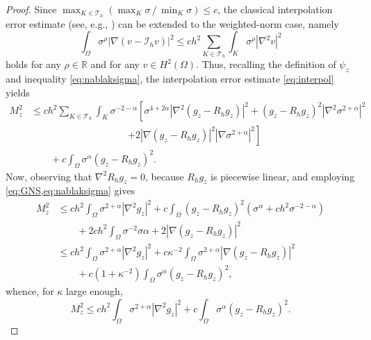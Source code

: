 \documentclass[final,hidelinks]{siamart1116Arxiv}
\numberwithin{theorem}{section}
\newcommand{\interpol}{{\mathcal{I}}}
\begin{document}
\begin{proof}
Since $\max_{K\in\mathcal T_h}(\max_K\sigma\,/\,\min_K\sigma)\leq c$, the classical interpolation error estimate (see, e.g., \cite[Theorem 3.4.3]{QV}) can be extended to the weighted-norm case, namely
\begin{equation}\label{eq:interpol}
 \int_\Omega\sigma^\rho|\nabla(v-\interpol_hv)|^2 \leq ch^2\sum_{K\in\mathcal T_h}\int_K\sigma^\rho|\nabla^2v|^2
\end{equation}
holds for any $\rho\in\mathbb R$ and for any $v\in H^2(\Omega)$.
Thus, recalling the definition of $\psi_z$ and inequality \cref{eq:nablaksigma}, the interpolation error estimate \cref{eq:interpol} yields
\begin{align}\label{eq:prepreprelemma1}
 M_z^2 &\leq ch^2\sum_{K\in\mathcal T_h}\int_K\sigma^{-2-\alpha}\left[\sigma^{4+2\alpha}|\nabla^2(g_z-R_hg_z)|^2 +(g_z-R_hg_z)^2|\nabla^2\sigma^{2+\alpha}|^2 \right.\\
 &\qquad\qquad\qquad\qquad\qquad\left.+ 2|\nabla (g_z-R_hg_z)|^2|\nabla\sigma^{2+\alpha}|^2\right]\\
 &\qquad+ c\int_\Omega\sigma^\alpha(g_z-R_hg_z)^2.
\end{align}
Now, observing that $\nabla^2R_hg_z=0$, because $R_hg_z$ is piecewise linear, and employing \cref{eq:GNS,eq:nablaksigma} gives
\begin{align}\label{eq:preprelemma1}
 M_z^2&\leq ch^2\int_\Omega\sigma^{2+\alpha}|\nabla^2g_z|^2 + c\int_\Omega(g_z-R_hg_z)^2\left(\sigma^\alpha+ch^2\sigma^{-2-\alpha}\right) \\
 &\qquad + 2ch^2\int_\Omega\sigma^{-2}\sigma{\alpha+2}|\nabla(g_z-R_hg_z)|^2\\
 &\leq ch^2\int_\Omega\sigma^{2+\alpha}|\nabla^2g_z|^2 + c\kappa^{-2}\int_\Omega\sigma^{2+\alpha}|\nabla(g_z-R_hg_z)|^2 \\
 &\qquad + c(1+\kappa^{-2})\int_\Omega\sigma^\alpha(g_z-R_hg_z)^2,
\end{align}
whence, for $\kappa$ large enough,
\begin{equation}\label{eq:prelemma1}
 M_z^2\leq ch^2\int_\Omega\sigma^{2+\alpha}|\nabla^2g_z|^2 + c\int_\Omega\sigma^\alpha(g_z-R_hg_z)^2.
\end{equation}



\end{proof}
\end{document}
